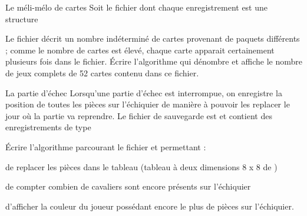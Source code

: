 \begin{Exercice}{Le méli-mélo de cartes}
	Soit le fichier  dont chaque
	enregistrement est une structure 


	Le fichier décrit un nombre indéterminé de
	cartes provenant de paquets différents ; comme le nombre de cartes est
	élevé, chaque carte apparait certainement plusieurs fois dans le
	fichier. Écrire l’algorithme qui dénombre et affiche le nombre de jeux
	complets de 52 cartes contenu dans ce fichier.
\end{Exercice}

\begin{Exercice}{La partie d’échec}
	Lorsqu’une partie d’échec est interrompue, on enregistre la position de
	toutes les pièces sur l’échiquier de manière à pouvoir les replacer le
	jour où la partie va reprendre. Le fichier de sauvegarde est  et
	contient des enregistrements de type 
	

	Écrire l’algorithme parcourant le fichier  et permettant :

	\begin{liste}
		\item 
			de replacer les pièces dans le tableau 
			(tableau à deux dimensions 8 x 8 de )
		\item 
			de compter combien de cavaliers sont encore présents sur l’échiquier
		\item 
			d’afficher la couleur du joueur possédant encore le plus de pièces sur
			l’échiquier.
	\end{liste}
\end{Exercice}	

